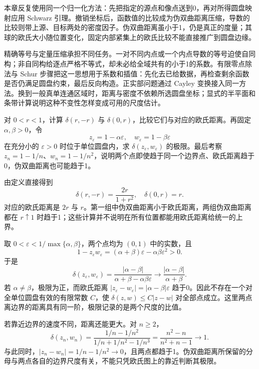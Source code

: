 



\begin{chaptersummary}
本章反复使用同一个归一化方法：先把指定的源点和像点送到0，再对所得圆盘映射应用 Schwarz 引理。撤销坐标后，函数值的比较成为伪双曲距离压缩，导数的比较则带上源、目标两处的密度因子。伪双曲距离虽小于1，仍是真正的度量；其球的欧氏大小随位置变化，固定内部紧集上的欧氏比较不能直接推广到圆盘边缘。

\ProseParagraphBreak

精确等号与定量压缩承担不同任务。一对不同内点或一个内点导数的等号迫使自同构；非自同构给逐点严格不等式，却未必给全域共有的小于1的系数。有限零点除法与 Schur 步骤把这一思想用于系数和插值：先化去已给数据，再检查剩余函数是否仍满足圆盘约束，最后反向构造。正实部问题通过 Cayley 变换接入同一方法。换到一般真单连通区域时，距离与密度不依赖所选圆盘坐标；显式的半平面和条带计算说明这种不变性怎样变成可用的尺度估计。
\end{chaptersummary}

\BookExercises

\begin{exercise}\label{b3:ex:06-1}
对 \(0<r<1\)，计算 \(\delta(r,-r)\) 与 \(\delta(0,r)\)，比较它们与对应的欧氏距离。再固定 \(\alpha,\beta>0\)，令
\[
 z_\varepsilon=1-\alpha\varepsilon,\quad
 w_\varepsilon=1-\beta\varepsilon
\]
在充分小的 \(\varepsilon>0\) 时位于单位圆盘内，求 \(\delta(z_\varepsilon,w_\varepsilon)\) 的极限。最后考察 \(z_n=1-1/n\)、\(w_n=1-1/n^2\)，说明两个点即使趋于同一个边界点、欧氏距离趋于0，伪双曲距离也可能趋于1。
\end{exercise}
\begin{solution}
由定义直接得到
\[
 \delta(r,-r)=\frac{2r}{1+r^2},
 \quad
 \delta(0,r)=r.
\]
对应的欧氏距离是 \(2r\) 与 \(r\)。第一组中伪双曲距离小于欧氏距离，两组伪双曲距离都在 \(r\uparrow1\) 时趋于1；这些计算并不说明在所有位置都能用欧氏距离给统一的上界。

取 \(0<\varepsilon<1/\max\{\alpha,\beta\}\)，两个点均为 \((0,1)\) 中的实数，且
\[
 1-z_\varepsilon w_\varepsilon
 =(\alpha+\beta)\varepsilon-\alpha\beta\varepsilon^2>0.
\]
于是
\[
 \delta(z_\varepsilon,w_\varepsilon)
 =\frac{|\alpha-\beta|}{\alpha+\beta-\alpha\beta\varepsilon}
 \longrightarrow\frac{|\alpha-\beta|}{\alpha+\beta}.
\]
若 \(\alpha\ne\beta\)，极限为正，而欧氏距离
\(|z_\varepsilon-w_\varepsilon|=|\alpha-\beta|\varepsilon\) 趋于0。因此不存在一个对全单位圆盘有效的有限常数 \(C\)，使 \(\delta(z,w)\le C|z-w|\) 对全部点成立。这里两点离边界的距离具有同一阶，极限记录的是两个尺度的比值。

若靠近边界的速度不同，距离还能更大。对 \(n\ge2\)，
\[
 \delta(z_n,w_n)
 =\frac{1/n-1/n^2}{1/n+1/n^2-1/n^3}
 =\frac{n^2-n}{n^2+n-1}\longrightarrow1.
\]
与此同时，\(|z_n-w_n|=1/n-1/n^2\to0\)，且两点都趋于1。伪双曲距离所保留的分母与两点各自的边界尺度有关，不能只凭欧氏图上的靠近判断其极限。
\end{solution}

